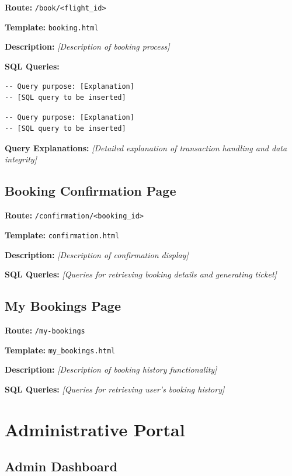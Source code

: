 \documentclass[12pt,a4paper,openany]{report}
\begin{document}
\textbf{Route:} \texttt{/book/<flight\_id>}

\textbf{Template:} \texttt{booking.html}

\textbf{Description:}
\textit{[Description of booking process]}

\textbf{SQL Queries:}

\begin{lstlisting}[caption={Create Booking - Insert Query}]
-- Query purpose: [Explanation]
-- [SQL query to be inserted]
\end{lstlisting}

\begin{lstlisting}[caption={Update Seat Availability}]
-- Query purpose: [Explanation]
-- [SQL query to be inserted]
\end{lstlisting}

\textbf{Query Explanations:}
\textit{[Detailed explanation of transaction handling and data integrity]}

\subsection{Booking Confirmation Page}

\textbf{Route:} \texttt{/confirmation/<booking\_id>}

\textbf{Template:} \texttt{confirmation.html}

\textbf{Description:}
\textit{[Description of confirmation display]}

\textbf{SQL Queries:}
\textit{[Queries for retrieving booking details and generating ticket]}

\subsection{My Bookings Page}

\textbf{Route:} \texttt{/my-bookings}

\textbf{Template:} \texttt{my\_bookings.html}

\textbf{Description:}
\textit{[Description of booking history functionality]}

\textbf{SQL Queries:}
\textit{[Queries for retrieving user's booking history]}

\section{Administrative Portal}

\subsection{Admin Dashboard}
\end{document}
